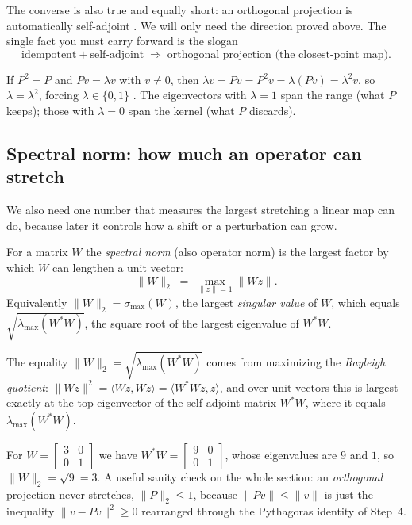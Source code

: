 \begin{remark}
The converse is also true and equally short: an orthogonal projection is automatically
self-adjoint \citep{projectors_garrett,wiki_projection}. We will only need the
direction proved above. The single fact you must carry forward is the slogan
\[
  \boxed{\ \text{idempotent} + \text{self-adjoint} \;\Longrightarrow\;
          \text{orthogonal projection (the closest-point map)}.\ }
\]
\end{remark}

\begin{corollary}
\label{cor:eig01}
If $P^2 = P$ and $Pv = \lambda v$ with $v \neq 0$, then $\lambda v = Pv = P^2 v =
\lambda(Pv) = \lambda^2 v$, so $\lambda = \lambda^2$, forcing $\lambda \in \{0,1\}$
\citep{wiki_projection}. The eigenvectors with $\lambda = 1$ span the range (what $P$
keeps); those with $\lambda = 0$ span the kernel (what $P$ discards).
\end{corollary}

\subsection{Spectral norm: how much an operator can stretch}

We also need one number that measures the largest stretching a linear map can do,
because later it controls how a shift or a perturbation can grow.

\begin{definition}
\label{def:specnorm}
For a matrix $W$ the \emph{spectral norm} (also operator norm) is the largest factor by
which $W$ can lengthen a unit vector:
\[
  \|W\|_2 \;=\; \max_{\|z\| = 1} \|Wz\| .
\]
Equivalently $\|W\|_2 = \sigma_{\max}(W)$, the largest \emph{singular value} of $W$,
which equals $\sqrt{\lambda_{\max}(W^\ast W)}$, the square root of the largest
eigenvalue of $W^\ast W$.
\end{definition}

The equality $\|W\|_2 = \sqrt{\lambda_{\max}(W^\ast W)}$ comes from maximizing the
\emph{Rayleigh quotient}: $\|Wz\|^2 = \langle Wz, Wz\rangle = \langle W^\ast W z,
z\rangle$, and over unit vectors this is largest exactly at the top eigenvector of the
self-adjoint matrix $W^\ast W$, where it equals $\lambda_{\max}(W^\ast W)$.

\begin{example}
For $W = \left[\begin{smallmatrix} 3 & 0 \\ 0 & 1 \end{smallmatrix}\right]$ we have
$W^\ast W = \left[\begin{smallmatrix} 9 & 0 \\ 0 & 1 \end{smallmatrix}\right]$, whose
eigenvalues are $9$ and $1$, so $\|W\|_2 = \sqrt 9 = 3$. A useful sanity check on the
whole section: an \emph{orthogonal} projection never stretches, $\|P\|_2 \le 1$,
because $\|Pv\| \le \|v\|$ is just the inequality $\|v-Pv\|^2 \ge 0$ rearranged through
the Pythagoras identity of Step~4.
\end{example}


